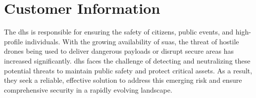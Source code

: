 \chapter{Customer Information}\label{cp:customer}

The \acrfull{dhs} is responsible for ensuring the safety of citizens, public events, and high-profile individuals. With the growing availability of \acrfull{suas}, the threat of hostile drones being used to deliver dangerous payloads or disrupt secure areas has increased significantly. \acrshort{dhs} faces the challenge of detecting and neutralizing these potential threats to maintain public safety and protect critical assets. As a result, they seek a reliable, effective solution to address this emerging risk and ensure comprehensive security in a rapidly evolving landscape.
